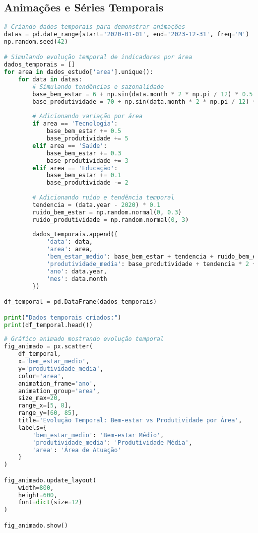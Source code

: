 \subsection{Animações e Séries Temporais}

\begin{pythonbox}
\begin{lstlisting}[language=Python]
# Criando dados temporais para demonstrar animações
datas = pd.date_range(start='2020-01-01', end='2023-12-31', freq='M')
np.random.seed(42)

# Simulando evolução temporal de indicadores por área
dados_temporais = []
for area in dados_estudo['area'].unique():
    for data in datas:
        # Simulando tendências e sazonalidade
        base_bem_estar = 6 + np.sin(data.month * 2 * np.pi / 12) * 0.5
        base_produtividade = 70 + np.sin(data.month * 2 * np.pi / 12) * 5
        
        # Adicionando variação por área
        if area == 'Tecnologia':
            base_bem_estar += 0.5
            base_produtividade += 5
        elif area == 'Saúde':
            base_bem_estar += 0.3
            base_produtividade += 3
        elif area == 'Educação':
            base_bem_estar += 0.1
            base_produtividade -= 2
        
        # Adicionando ruído e tendência temporal
        tendencia = (data.year - 2020) * 0.1
        ruido_bem_estar = np.random.normal(0, 0.3)
        ruido_produtividade = np.random.normal(0, 3)
        
        dados_temporais.append({
            'data': data,
            'area': area,
            'bem_estar_medio': base_bem_estar + tendencia + ruido_bem_estar,
            'produtividade_media': base_produtividade + tendencia * 2 + ruido_produtividade,
            'ano': data.year,
            'mes': data.month
        })

df_temporal = pd.DataFrame(dados_temporais)

print("Dados temporais criados:")
print(df_temporal.head())
\end{lstlisting}
\end{pythonbox}

\begin{pythonbox}
\begin{lstlisting}[language=Python]
# Gráfico animado mostrando evolução temporal
fig_animado = px.scatter(
    df_temporal,
    x='bem_estar_medio',
    y='produtividade_media',
    color='area',
    animation_frame='ano',
    animation_group='area',
    size_max=20,
    range_x=[5, 8],
    range_y=[60, 85],
    title='Evolução Temporal: Bem-estar vs Produtividade por Área',
    labels={
        'bem_estar_medio': 'Bem-estar Médio',
        'produtividade_media': 'Produtividade Média',
        'area': 'Área de Atuação'
    }
)

fig_animado.update_layout(
    width=800,
    height=600,
    font=dict(size=12)
)

fig_animado.show()
\end{lstlisting}
\end{pythonbox}

